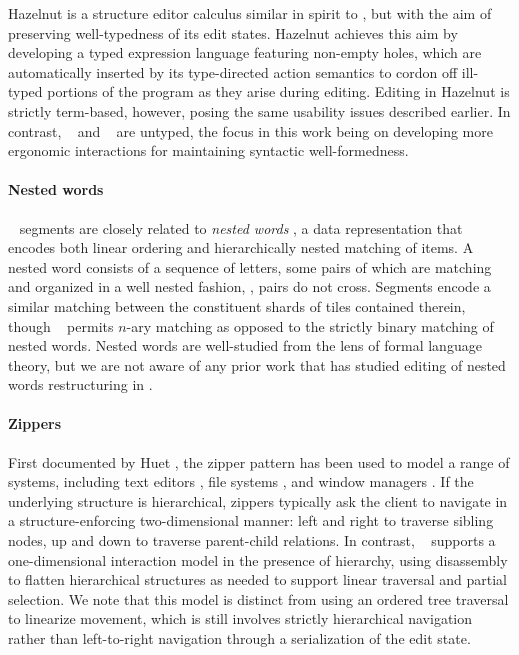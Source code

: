 Hazelnut \cite{Hazelnut} is a structure editor calculus
similar in spirit to \ty, but with the aim of
preserving well-typedness of its edit states.
Hazelnut achieves this aim by developing a typed
expression language featuring non-empty holes, which
are automatically inserted by its type-directed action
semantics to cordon off ill-typed portions of the program
as they arise during editing.
Editing in Hazelnut is strictly term-based, however, posing
the same usability issues described earlier.
In contrast, \ty~ and \tylr~ are untyped, the focus in
this work being on developing more ergonomic interactions
for maintaining syntactic well-formedness.


\paragraph{Nested words}
\ty~ segments are closely related to \emph{nested words}
\cite{nested-words},
a data representation that encodes both linear
ordering and hierarchically nested matching
of items.
A nested word consists of a sequence of letters,
some pairs of which are matching and organized
in a well nested fashion, \ie, pairs do not cross.
Segments encode a similar matching between the
constituent shards of tiles contained therein,
though \ty~ permits $n$-ary matching as opposed
to the strictly binary matching of nested words.
Nested words are well-studied from the lens of
formal language theory, but we are not aware of
any prior work that has studied editing of nested words
\ala restructuring in \tylr.

\paragraph{Zippers}
First documented by Huet
\cite{zipper}, the zipper pattern has been used to model a range of systems,
including text editors \cite{lazy-functional-incremental-parsing},
file systems \cite{zipper-fs}, and window managers \cite{window-manager}.
If the underlying structure is hierarchical,
zippers typically ask the client to navigate
in a structure-enforcing two-dimensional manner: left and right to traverse
sibling nodes, up and down to traverse parent-child relations.
In contrast, \ty~ supports a one-dimensional interaction model
in the presence of hierarchy, using disassembly to flatten
hierarchical structures as needed to support linear traversal
and partial selection.
We note that this model is distinct from using an ordered tree
traversal to linearize movement, which is still involves
strictly hierarchical navigation rather than
left-to-right navigation through a serialization of the edit state.

